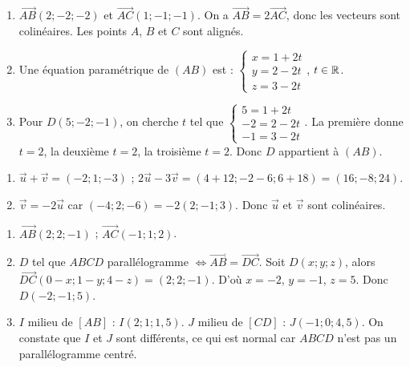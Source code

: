 \begin{enumerate}[label=\alph*)]
\item $\overrightarrow{AB}(2;-2;-2)$ et $\overrightarrow{AC}(1;-1;-1)$. On a $\overrightarrow{AB}=2\overrightarrow{AC}$, donc les vecteurs sont colinéaires. Les points $A$, $B$ et $C$ sont alignés.
\item Une équation paramétrique de $(AB)$ est : $\begin{cases} x=1+2t \\ y=2-2t \\ z=3-2t \end{cases}$, $t\in\mathbb{R}$.
\item Pour $D(5;-2;-1)$, on cherche $t$ tel que $\begin{cases} 5=1+2t \\ -2=2-2t \\ -1=3-2t \end{cases}$. La première donne $t=2$, la deuxième $t=2$, la troisième $t=2$. Donc $D$ appartient à $(AB)$.
\end{enumerate}

\begin{enumerate}[label=\alph*)]
\item $\vec{u}+\vec{v}=(-2;1;-3)$ ; $2\vec{u}-3\vec{v}=(4+12;-2-6;6+18)=(16;-8;24)$.
\item $\vec{v}=-2\vec{u}$ car $(-4;2;-6)=-2(2;-1;3)$. Donc $\vec{u}$ et $\vec{v}$ sont colinéaires.
\end{enumerate}

\begin{enumerate}[label=\alph*)]
\item $\overrightarrow{AB}(2;2;-1)$ ; $\overrightarrow{AC}(-1;1;2)$.
\item $D$ tel que $ABCD$ parallélogramme $\Leftrightarrow \overrightarrow{AB}=\overrightarrow{DC}$. Soit $D(x;y;z)$, alors $\overrightarrow{DC}(0-x;1-y;4-z)=(2;2;-1)$. D'où $x=-2$, $y=-1$, $z=5$. Donc $D(-2;-1;5)$.
\item $I$ milieu de $[AB]$ : $I(2;1;1,5)$. $J$ milieu de $[CD]$ : $J(-1;0;4,5)$. On constate que $I$ et $J$ sont différents, ce qui est normal car $ABCD$ n'est pas un parallélogramme centré.
\end{enumerate}

